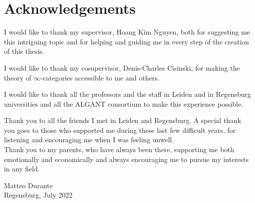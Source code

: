 \chapter*{Acknowledgements}

I would like to thank my supervisor, Hoang Kim Nguyen, both for suggesting me
this intriguing topic and for helping and guiding me in every step of the
creation of this thesis.

\noindent I would like to thank my cosupervisor, Denis-Charles Cisinski, for making the
theory of $\infty$-categories accessible to me and others.

\noindent I would like to thank all the professors and the staff in Leiden and in
Regensburg universities and all the ALGANT consortium to make this experience
possible.

\noindent Thank you to all the friends I met in Leiden and Regensburg. A special thank you
goes to those who supported me during these last few difficult years, for
listening and encouraging me when I was feeling unwell.\\

\noindent Thank you to my parents, who have always been there, supporting me both
emotionally and economically and always encouraging me to pursue my
interests in any field.

\begin{flushright}
	Matteo Durante \\ Regensburg, July 2022
\end{flushright}
